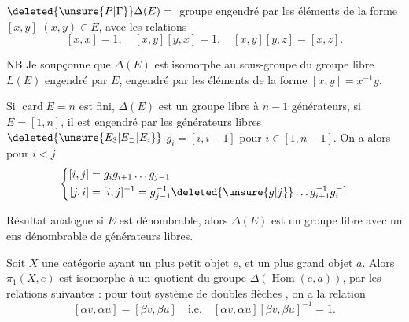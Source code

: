 $\deleted{\unsure{P|\Gamma}}\Delta(E)={}$ groupe engendré par les éléments de la forme $[x,y]$ $(x,y)\in E$, avec les relations
\[
[x,x]=1,\quad [x,y][y,x]=1,\quad [x,y][y,z]=[x,z].
\]

NB Je soupçonne que $\Delta(E)$ est isomorphe au sous-groupe du groupe libre $L(E)$ engendré par $E$, engendré par les éléments de la forme $[x,y]=x^{-1}y$.

Si $\operatorname{card}E=n$ est fini, $\Delta(E)$ est un groupe libre à $n-1$ générateurs, si $E=[1,n]$, il est engendré par les générateurs libres $\deleted{\unsure{E_3|E_{\supset}|E_i}}$ $g_i=[i,i+1]$ pour $i\in[1,n-1]$. On a alors pour $i<j$
\[
\left\{\begin{aligned}
[i,j]&=g_ig_{i+1}\ldots g_{j-1}\\
[j,i]&=[i,j]^{-1}=g_{j-1}^{-1}\deleted{\unsure{g|j}}\ldots g_{i+1}^{-1}g_i^{-1}
\end{aligned}\right.
\]

Résultat analogue si $E$ est dénombrable, alors $\Delta(E)$ est un groupe libre avec un ens dénombrable de générateurs libres.

Soit $X$ une catégorie ayant un plus petit objet $e$, et un plus grand objet $a$. Alors $\pi_1(X,e)$ est isomorphe  à un quotient du groupe $\Delta(\operatorname{Hom}(e,a))$, par les relations suivantes : pour tout système de doubles flèches
,  on a la relation
\[
\boxed{[\alpha v,\alpha u]=[\beta v,\beta u]}\quad\text{i.e.}\quad
[\alpha v,\alpha u][\beta v,\beta u]^{-1}=1.
\]
